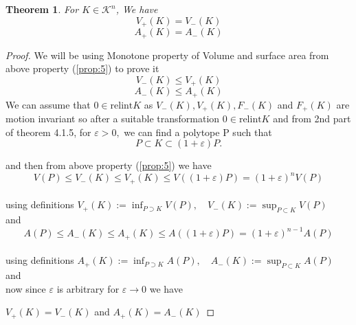 \documentclass[oneside]{book}
\newtheorem{theorem}{Theorem}[section]
\begin{document}
	\begin{theorem}     
		\label{t:9}
		For $K \in \mathcal{K}^{n}$, We have 
		\begin{equation}
		\label{eq46}
		V_{+}(K)=V_{-}(K)
		\end{equation}
		\begin{equation}
		\label{eq47}
		A_{+}(K)=A_{-}(K)
		\end{equation}
	\end{theorem}         
	\begin{proof}
		We will be using Monotone property of Volume and surface area from above property (\ref{prop:5}) to prove it \\
		$$V_{-}(K) \leq V_{+}(K)  $$  $$ A_{-}(K) \leq A_{+}(K)$$
		We can assume that $0 \in \text{relint} K$ as  $V_{-}(K), V_{+}(K), F_{-}(K)$ and $F_{+}(K)$ are \newline motion invariant so after a suitable transformation
		$0 \in \text{relint} K$ 
		and from 2nd part of theorem 4.1.5,
		for $\varepsilon>0,$ we can find a polytope P such that 
		$$P \subset K \subset(1+\varepsilon) P .$$
		
		and then from above property (\ref{prop:5}) we have \\ 
		\[
		V(P) \leq V_{-}(K) \leq V_{+}(K) \leq V((1+\varepsilon) P)=(1+\varepsilon)^{n} V(P)
		\] \\
		using definitions $ V_{+}(K):=\inf _{P \supset K} V(P), \quad V_{-}(K):=\sup _{P \subset K} V(P)$ \\
		and   \\
		\[
		A(P) \leq A_{-}(K) \leq A_{+}(K) \leq A((1+\varepsilon) P)=(1+\varepsilon)^{n-1} A(P)
		\]  \\using definitions 
		$ A_{+}(K):=\inf _{P \supset K} A(P), \quad A_{-}(K):=\sup _{P \subset K} A(P) $
		and \\ 
		
		now since $\varepsilon $ is arbitrary for $\varepsilon \rightarrow 0$ we have 
		
		$V_{+}(K)=V_{-}(K)$ and  $A_{+}(K)=A_{-}(K)$
	\end{proof}
	
\end{document}

